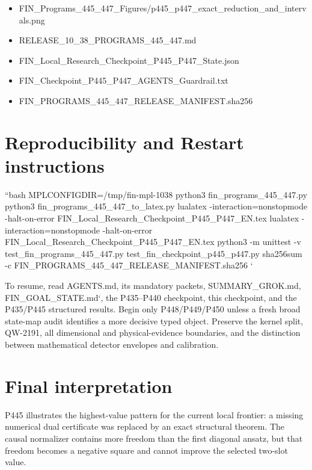 \documentclass[11pt,a4paper,openany]{report}
\begin{document}
\begin{itemize}
\item 
FIN\_Programs\_445\_447\_Figures/\allowbreak{}p445\_p447\_exact\_reduction\_and\_intervals.png

\item 
RELEASE\_10\_38\_PROGRAMS\_445\_447.md

\item 
FIN\_Local\_Research\_Checkpoint\_P445\_P447\_State.json

\item 
FIN\_Checkpoint\_P445\_P447\_AGENTS\_Guardrail.txt

\item 
FIN\_PROGRAMS\_445\_447\_RELEASE\_MANIFEST.sha256

\end{itemize}

\chapter{Reproducibility and Restart instructions}

``bash MPLCONFIGDIR=/\allowbreak{}tmp/\allowbreak{}fin-mpl-1038 python3 fin\_programs\_445\_447.py python3 fin\_programs\_445\_447\_to\_latex.py lualatex -interaction=nonstopmode -halt-on-error FIN\_Local\_Research\_Checkpoint\_P445\_P447\_EN.tex lualatex -interaction=nonstopmode -halt-on-error FIN\_Local\_Research\_Checkpoint\_P445\_P447\_EN.tex python3 -m unittest -v test\_fin\_programs\_445\_447.py test\_fin\_checkpoint\_p445\_p447.py sha256sum -c FIN\_PROGRAMS\_445\_447\_RELEASE\_MANIFEST.sha256 `

To resume, read AGENTS.md, its mandatory packets, SUMMARY\_GROK.md, FIN\_GOAL\_STATE.md`, the P435--P440 checkpoint, this checkpoint, and the P435/\allowbreak{}P445 structured results. Begin only P448/\allowbreak{}P449/\allowbreak{}P450 unless a fresh broad state-map audit identifies a more decisive typed object. Preserve the kernel split, QW-2191, all dimensional and physical-evidence boundaries, and the distinction between mathematical detector envelopes and calibration.

\chapter{Final interpretation}

P445 illustrates the highest-value pattern for the current local frontier: a missing numerical dual certificate was replaced by an exact structural theorem. The causal normalizer contains more freedom than the first diagonal ansatz, but that freedom becomes a negative square and cannot improve the selected two-slot value.
\end{document}
